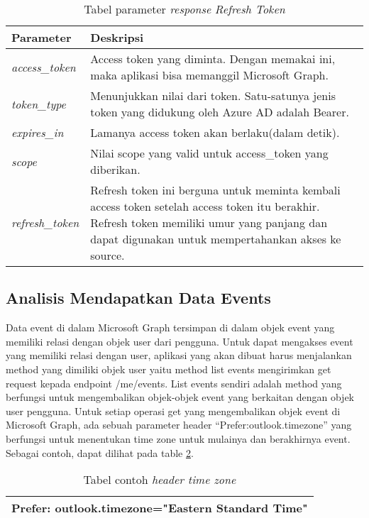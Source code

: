 \begin{table}[H]
	\centering 
	\caption{Tabel parameter \textit{response} \textit{Refresh Token}}
	\label{tab:parameter_response_refresh_token}
	\begin{tabular}{|p{3cm}|p{9cm}|}
	\toprule
	 \textbf{Parameter} & \textbf{Deskripsi}\\ \hline 
	 \textit{access\_token} & Access token yang diminta. Dengan memakai ini, maka aplikasi bisa memanggil Microsoft Graph. \\ \hline 
	\textit{token\_type} & Menunjukkan nilai dari token. Satu-satunya jenis token yang didukung oleh Azure AD adalah Bearer.\\ \hline 
	\textit{expires\_in} & Lamanya access token akan berlaku(dalam detik). \\ \hline 
	\textit{scope} & Nilai scope yang valid untuk access\_token yang diberikan.  \\ \hline  
	\textit{refresh\_token} & Refresh token ini berguna untuk meminta kembali access token setelah access token itu berakhir. Refresh token memiliki umur yang panjang dan dapat digunakan untuk mempertahankan akses ke source. \\
	\bottomrule
	\end{tabular}  
\end{table}

\subsection{Analisis Mendapatkan Data Events}
\label{sec:analisis_mendapatkan_data_events}
Data event di dalam Microsoft Graph tersimpan di dalam objek event yang memiliki relasi dengan objek user dari pengguna. Untuk dapat mengakses event yang memiliki relasi dengan user, aplikasi yang akan dibuat harus menjalankan method yang dimiliki objek user yaitu method list events mengirimkan get request kepada endpoint /me/events. List events sendiri adalah method yang berfungsi untuk mengembalikan objek-objek event yang berkaitan dengan objek user pengguna. Untuk setiap operasi get yang mengembalikan objek event di Microsoft Graph, ada sebuah parameter header ``Prefer:outlook.timezone'' yang berfungsi untuk menentukan time zone untuk mulainya dan berakhirnya event. Sebagai contoh, dapat dilihat pada table \ref{tab:contoh_header_time_zone}. 

\begin{table}[H]
	\centering 
	\caption{Tabel contoh \textit{header time zone}}
	\label{tab:contoh_header_time_zone}
	\begin{tabular}{|p{9cm}|}
	\toprule
	 Prefer: outlook.timezone="Eastern Standard Time" \\
	\bottomrule
	\end{tabular}  
\end{table}

